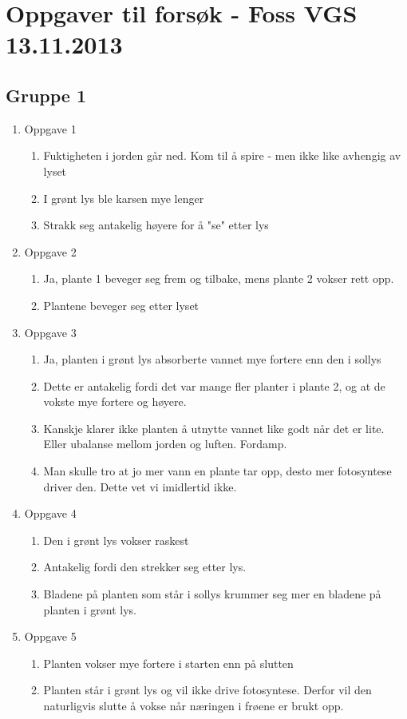 \section{Oppgaver til forsøk - Foss VGS 13.11.2013}

\subsection{Gruppe 1}

\begin{enumerate}
	\item Oppgave 1
	\begin{enumerate}
		\item Fuktigheten i jorden går ned. Kom til å spire - men ikke like avhengig av lyset
		\item I grønt lys ble karsen mye lenger
		\item Strakk seg antakelig høyere for å "se" etter lys
	\end{enumerate}

	\item Oppgave 2
	\begin{enumerate}
		\item Ja, plante 1 beveger seg frem og tilbake, mens plante 2 vokser rett opp.
		\item Plantene beveger seg etter lyset
	\end{enumerate}	

	\item Oppgave 3
	\begin{enumerate}
		\item Ja, planten i grønt lys absorberte vannet mye fortere enn den i sollys
		\item Dette er antakelig fordi det var mange fler planter i plante 2, og at de vokste mye fortere og høyere. 
		\item Kanskje klarer ikke planten å utnytte vannet like godt når det er lite. Eller ubalanse mellom jorden og luften. Fordamp.
		\item Man skulle tro at jo mer vann en plante tar opp, desto mer fotosyntese driver den. Dette vet vi imidlertid ikke.
	\end{enumerate}

	\item Oppgave 4
	\begin{enumerate}
		\item Den i grønt lys vokser raskest
		\item Antakelig fordi den strekker seg etter lys. 
		\item Bladene på planten som står i sollys krummer seg mer en bladene på planten i grønt lys. 
	\end{enumerate}

	\item Oppgave 5
	\begin{enumerate}
		\item Planten vokser mye fortere i starten enn på slutten
		\item Planten står i grønt lys og vil ikke drive fotosyntese. Derfor vil den naturligvis slutte å vokse når næringen i frøene er brukt opp. 
	\end{enumerate}
\end{enumerate}


